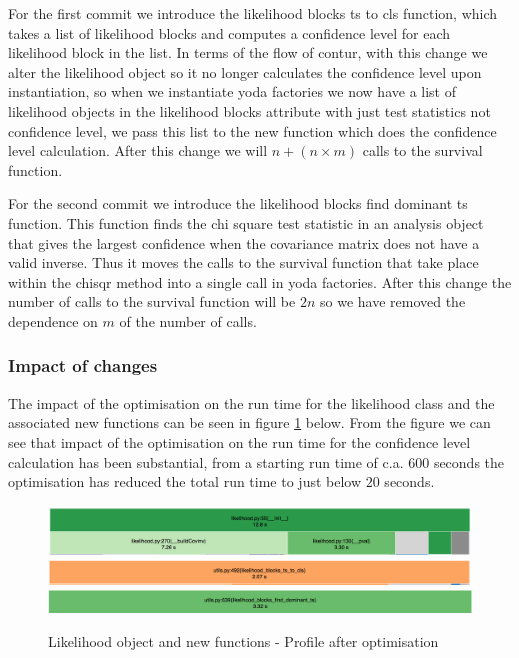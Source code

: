 For the first commit we introduce the likelihood blocks ts to cls function, which takes a list of likelihood blocks and computes a confidence level for each likelihood block in the list. In terms of the flow of contur, with this change we alter the likelihood object so it no longer calculates the confidence level upon instantiation, so when we instantiate yoda factories we now have a list of likelihood objects in the likelihood blocks attribute with just test statistics not confidence level, we pass this list to the new function which does the confidence level calculation. After this change we will $n + (n\times m)$ calls to the survival function.

For the second commit we introduce the likelihood blocks find dominant ts function. This function finds the chi square test statistic in an analysis object that gives the largest confidence when the covariance matrix does not have a valid inverse. Thus it moves the calls to the survival function that take place within the chisqr method into a single call in yoda factories. After this change the number of calls to the survival function will be $2n$ so we have removed the dependence on $m$ of the number of calls.

\subsubsection{Impact of changes}

The impact of the optimisation on the run time for the likelihood class and the associated new functions can be seen in figure \ref{fig:like_last_profile} below. From the figure we can see that impact of the optimisation on the run time for the confidence level calculation has been substantial, from a starting run time of c.a. $600$ seconds the optimisation has reduced the total run time to just below $20$ seconds.

\begin{figure}[H]
\centering
\includegraphics[scale=0.3]{plots/like_after_change.png}
\includegraphics[scale=0.3]{plots/like_ts_to_cls.png}
\includegraphics[scale=0.3]{plots/like_blocks_find_dominant_ts.png}
\caption{Likelihood object and new functions - Profile after optimisation}
\label{fig:like_last_profile}
\end{figure} 








